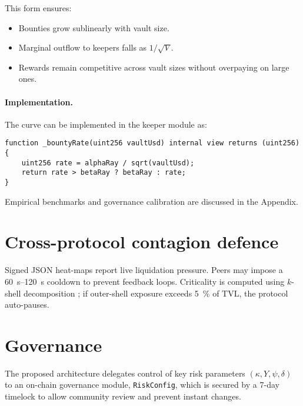 \documentclass[11pt]{article}
\begin{document}
This form ensures:
\begin{itemize}[noitemsep,topsep=0pt]
  \item Bounties grow sublinearly with vault size.
  \item Marginal outflow to keepers falls as \( 1/\sqrt{V} \).
  \item Rewards remain competitive across vault sizes without overpaying on large ones.
\end{itemize}

\paragraph{Implementation.} The curve can be implemented in the keeper module as:

\begin{lstlisting}[caption={Reward curve for vault liquidations}]
function _bountyRate(uint256 vaultUsd) internal view returns (uint256) {
    uint256 rate = alphaRay / sqrt(vaultUsd);
    return rate > betaRay ? betaRay : rate;
}
\end{lstlisting}

Empirical benchmarks and governance calibration are discussed in the Appendix.


\section{Cross-protocol contagion defence}
\label{sec:contagion}
Signed JSON heat-maps report live liquidation pressure.  
Peers may impose a \SIrange{60}{120}{\second} cooldown to prevent feedback loops.  
Criticality is computed using $k$-shell decomposition \parencite{battiston2016debtrank};  
if outer-shell exposure exceeds \SI{5}{\percent} of TVL, the protocol auto-pauses.

\section{Governance}
\label{sec:governance}
The proposed architecture delegates control of key risk parameters \((\kappa, Y, \psi, \delta)\) to an on-chain governance module, \texttt{RiskConfig}, which is secured by a 7-day timelock to allow community review and prevent instant changes.
\end{document}
